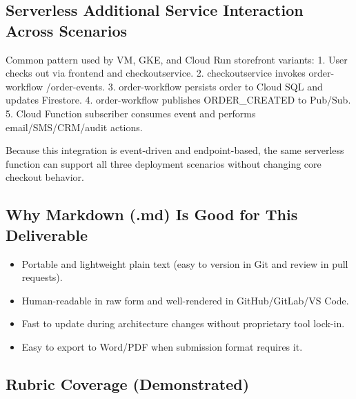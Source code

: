 \documentclass[
]{article}
\providecommand{\tightlist}{%
  \setlength{\itemsep}{0pt}\setlength{\parskip}{0pt}}
\begin{document}
\subsection{Serverless Additional Service Interaction Across
Scenarios}\label{serverless-additional-service-interaction-across-scenarios}

Common pattern used by VM, GKE, and Cloud Run storefront variants: 1.
User checks out via frontend and checkoutservice. 2. checkoutservice
invokes order-workflow /order-events. 3. order-workflow persists order
to Cloud SQL and updates Firestore. 4. order-workflow publishes
ORDER\_CREATED to Pub/Sub. 5. Cloud Function subscriber consumes event
and performs email/SMS/CRM/audit actions.

Because this integration is event-driven and endpoint-based, the same
serverless function can support all three deployment scenarios without
changing core checkout behavior.

\subsection{Why Markdown (.md) Is Good for This
Deliverable}\label{why-markdown-.md-is-good-for-this-deliverable}

\begin{itemize}
\tightlist
\item
  Portable and lightweight plain text (easy to version in Git and review
  in pull requests).
\item
  Human-readable in raw form and well-rendered in GitHub/GitLab/VS Code.
\item
  Fast to update during architecture changes without proprietary tool
  lock-in.
\item
  Easy to export to Word/PDF when submission format requires it.
\end{itemize}

\subsection{Rubric Coverage
(Demonstrated)}\label{rubric-coverage-demonstrated}
\end{document}

